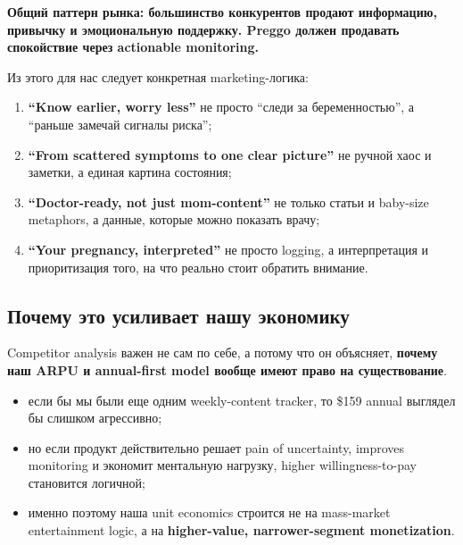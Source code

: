 \documentclass[10pt,a4paper]{article}
\newcommand{\bluequote}[1]{%
\begin{tcolorbox}[
    enhanced,
    breakable,
    colback=brandblush,
    colframe=brandcoraldeep,
    boxrule=0.85pt,
    arc=3pt,
    left=8pt,right=8pt,top=6pt,bottom=6pt
]
#1
\end{tcolorbox}
}
\begin{document}
\bluequote{\textbf{Общий паттерн рынка: большинство конкурентов продают информацию, привычку и эмоциональную поддержку. Preggo должен продавать спокойствие через actionable monitoring.}}

Из этого для нас следует конкретная marketing-логика:

\begin{greenbox}
\begin{enumerate}
    \item \textbf{``Know earlier, worry less''}  
    не просто ``следи за беременностью'', а ``раньше замечай сигналы риска'';

    \item \textbf{``From scattered symptoms to one clear picture''}  
    не ручной хаос и заметки, а единая картина состояния;

    \item \textbf{``Doctor-ready, not just mom-content''}  
    не только статьи и baby-size metaphors, а данные, которые можно показать врачу;

    \item \textbf{``Your pregnancy, interpreted''}  
    не просто logging, а интерпретация и приоритизация того, на что реально стоит обратить внимание.
\end{enumerate}
\end{greenbox}

\subsection{Почему это усиливает нашу экономику}

Competitor analysis важен не сам по себе, а потому что он объясняет, \textbf{почему наш ARPU и annual-first model вообще имеют право на существование}.

\begin{itemize}
    \item если бы мы были еще одним weekly-content tracker, то \$159 annual выглядел бы слишком агрессивно;
    \item но если продукт действительно решает pain of uncertainty, improves monitoring и экономит ментальную нагрузку, higher willingness-to-pay становится логичной;
    \item именно поэтому наша unit economics строится не на mass-market entertainment logic, а на \textbf{higher-value, narrower-segment monetization}.
\end{itemize}
\end{document}
